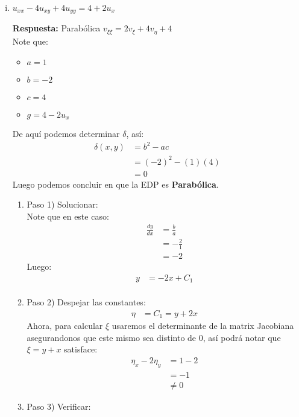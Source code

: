 \begin{homeworkProblem}
\begin{enumerate}[(i)]
\begin{solucion}
\begin{enumerate}
    \end{enumerate}
\end{solucion}
    \item $u_{xx}-4u_{xy}+4u_{yy}=4+2u_{x}$ 
\begin{solucion}
    \textbf{Respuesta:} Parabólica $v_{\xi\xi}=2v_{\xi}+4v_{\eta}+4$\\
    Note que:
    \begin{itemize}
        \item $a=1$
        \item $b=-2$
        \item $c=4$
        \item $g=4-2u_{x}$
    \end{itemize}
    De aquí podemos determinar $\delta$, así:
    \begin{align*}
        \delta(x,y)&=b^2-ac\\
        &=(-2)^2-(1)(4)\\
        &=0
    \end{align*}
    Luego podemos concluir en que la EDP es \textbf{Parabólica}.
    \begin{enumerate}
        \item Paso 1) Solucionar:\\
        Note que en este caso:
        \begin{align*}
            \frac{dy}{dx}&=\frac{b}{a}\\
            &=-\frac{2}{1}\\
            &=-2
        \end{align*}
        Luego:
        \begin{align*}
            y&=-2x+C_1\\
        \end{align*}
        \item Paso 2) Despejar las constantes:\\
        \begin{align*}
            \eta&=C_1=y+2x
        \end{align*}
        Ahora, para calcular $\xi$ usaremos el determinante de la matrix Jacobiana asegurandonos que este mismo sea distinto de $0$, así podrá notar que $\xi=y+x$ satisface:
        \begin{align*}
            \eta_{x}-2\eta_{y}&=1-2\\
            &=-1\\
            &\neq 0
        \end{align*}
        \item Paso 3) Verificar:\\

\end{enumerate}
\end{solucion}
\end{enumerate}
\end{homeworkProblem}
